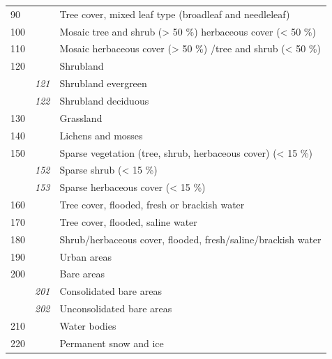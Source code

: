 \begin{table}[htbp]
\begin{tabular}{lll}
90&& Tree cover, mixed leaf type (broadleaf and needleleaf)          \\ 
 100&& Mosaic tree and shrub (> 50 \%) herbaceous cover (< 50 \%) \\
 110&& Mosaic herbaceous cover (> 50 \%) /tree and shrub (< 50 \%) \\
 120&& Shrubland\\
 & \textit{121}& Shrubland evergreen\\
 & \textit{122}& Shrubland deciduous\\
 130 && Grassland\\
 140 && Lichens and mosses\\
 150 && Sparse vegetation (tree, shrub, herbaceous cover) (< 15 \%)\\
 & \textit{152}& Sparse shrub (< 15 \%)\\
 & \textit{153}& Sparse herbaceous cover (< 15 \%) \\
 160&& Tree cover, flooded, fresh or brackish water\\
 170&& Tree cover, flooded, saline water\\
 180&& Shrub/herbaceous cover, flooded, fresh/saline/brackish water\\
 190&& Urban areas\\
 200&& Bare areas\\
 & \textit{201}& Consolidated bare areas\\
 & \textit{202}& Unconsolidated bare areas\\
 210 && Water bodies\\
 220 && Permanent snow and ice\\ \bottomrule
\end{tabular}
\end{table}


